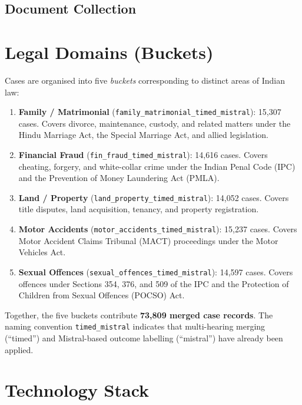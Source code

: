 \documentclass[12pt,a4paper]{report}
\begin{document}
\subsection{Document Collection}
\label{sec:doc_collection}


\section{Legal Domains (Buckets)}
\label{sec:buckets}

Cases are organised into five \textit{buckets} corresponding to distinct areas of Indian law:

\begin{enumerate}
  \item \textbf{Family / Matrimonial} (\texttt{family\_matrimonial\_timed\_mistral}): 15,307 cases. Covers divorce, maintenance, custody, and related matters under the Hindu Marriage Act, the Special Marriage Act, and allied legislation.
  \item \textbf{Financial Fraud} (\texttt{fin\_fraud\_timed\_mistral}): 14,616 cases. Covers cheating, forgery, and white-collar crime under the Indian Penal Code (IPC) and the Prevention of Money Laundering Act (PMLA).
  \item \textbf{Land / Property} (\texttt{land\_property\_timed\_mistral}): 14,052 cases. Covers title disputes, land acquisition, tenancy, and property registration.
  \item \textbf{Motor Accidents} (\texttt{motor\_accidents\_timed\_mistral}): 15,237 cases. Covers Motor Accident Claims Tribunal (MACT) proceedings under the Motor Vehicles Act.
  \item \textbf{Sexual Offences} (\texttt{sexual\_offences\_timed\_mistral}): 14,597 cases. Covers offences under Sections 354, 376, and 509 of the IPC and the Protection of Children from Sexual Offences (POCSO) Act.
\end{enumerate}

Together, the five buckets contribute \textbf{73,809 merged case records}. The naming convention \texttt{timed\_mistral} indicates that multi-hearing merging (``timed'') and Mistral-based outcome labelling (``mistral'') have already been applied.

\section{Technology Stack}
\label{sec:tech_stack}
\end{document}
